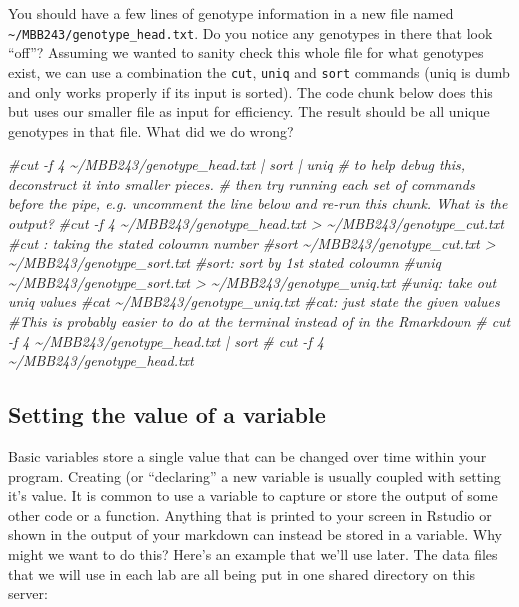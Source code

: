 \documentclass[
]{article}
\newenvironment{Shaded}{\begin{snugshade}}{\end{snugshade}}
\newcommand{\CommentTok}[1]{\textcolor[rgb]{0.56,0.35,0.01}{\textit{#1}}}
\begin{document}
You should have a few lines of genotype information in a new file named
\texttt{\textasciitilde{}/MBB243/genotype\_head.txt}. Do you notice any
genotypes in there that look ``off''? Assuming we wanted to sanity check
this whole file for what genotypes exist, we can use a combination the
\texttt{cut}, \texttt{uniq} and \texttt{sort} commands (uniq is dumb and
only works properly if its input is sorted). The code chunk below does
this but uses our smaller file as input for efficiency. The result
should be all unique genotypes in that file. What did we do wrong?

\begin{Shaded}
\begin{Highlighting}[]
\CommentTok{\#cut {-}f 4 \textasciitilde{}/MBB243/genotype\_head.txt | sort | uniq}
\CommentTok{\# to help debug this, deconstruct it into smaller pieces.}
\CommentTok{\# then try running each set of commands before the pipe, e.g. uncomment the line below and re{-}run this chunk. What is the output?  }
\CommentTok{\#cut {-}f 4 \textasciitilde{}/MBB243/genotype\_head.txt \textgreater{} \textasciitilde{}/MBB243/genotype\_cut.txt}
\CommentTok{\#cut : taking the stated coloumn number}
\CommentTok{\#sort \textasciitilde{}/MBB243/genotype\_cut.txt \textgreater{} \textasciitilde{}/MBB243/genotype\_sort.txt}
\CommentTok{\#sort: sort by 1st stated coloumn}
\CommentTok{\#uniq \textasciitilde{}/MBB243/genotype\_sort.txt \textgreater{} \textasciitilde{}/MBB243/genotype\_uniq.txt}
\CommentTok{\#uniq: take out uniq values}
\CommentTok{\#cat \textasciitilde{}/MBB243/genotype\_uniq.txt}
\CommentTok{\#cat: just state the given values}
\CommentTok{\#This is probably easier to do at the terminal instead of in the Rmarkdown}
\CommentTok{\# cut {-}f 4 \textasciitilde{}/MBB243/genotype\_head.txt | sort }
\CommentTok{\# cut {-}f 4 \textasciitilde{}/MBB243/genotype\_head.txt }
\end{Highlighting}
\end{Shaded}

\hypertarget{setting-the-value-of-a-variable}{%
\subsection{Setting the value of a
variable}\label{setting-the-value-of-a-variable}}

Basic variables store a single value that can be changed over time
within your program. Creating (or ``declaring'' a new variable is
usually coupled with setting it's value. It is common to use a variable
to capture or store the output of some other code or a function.
Anything that is printed to your screen in Rstudio or shown in the
output of your markdown can instead be stored in a variable. Why might
we want to do this? Here's an example that we'll use later. The data
files that we will use in each lab are all being put in one shared
directory on this server:
\end{document}
